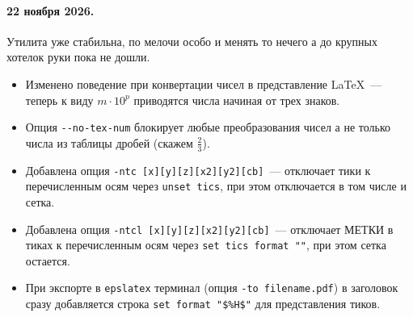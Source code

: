 \documentclass[12pt]{article}
\begin{document}
\paragraph{22 ноября 2026.} Утилита уже стабильна, по мелочи особо и менять то нечего а до крупных хотелок руки пока не дошли.
\begin{itemize}
\item Изменено поведение при конвертации чисел в представление \LaTeX~--- теперь к виду $m\cdot10^p$
  приводятся числа начиная от трех знаков.
\item Опция \verb'--no-tex-num' блокирует любые преобразования чисел а не только числа из таблицы дробей (скажем $\frac 23$).
\item Добавлена опция \verb'-ntc [x][y][z][x2][y2][cb]'~--- отключает тики к перечисленным осям через \verb'unset tics',
  при этом отключается в том числе и сетка.
\item Добавлена опция \verb'-ntcl [x][y][z][x2][y2][cb]'~---  отключает МЕТКИ в тиках к перечисленным осям через 
  \verb'set tics format ""', при этом сетка остается.
\item При экспорте в \verb'epslatex' терминал (опция \verb'-to filename.pdf')
  в заголовок сразу добавляется строка \verb'set format "$%H$"' для представления тиков.
\end{itemize}
       
\end{document}
